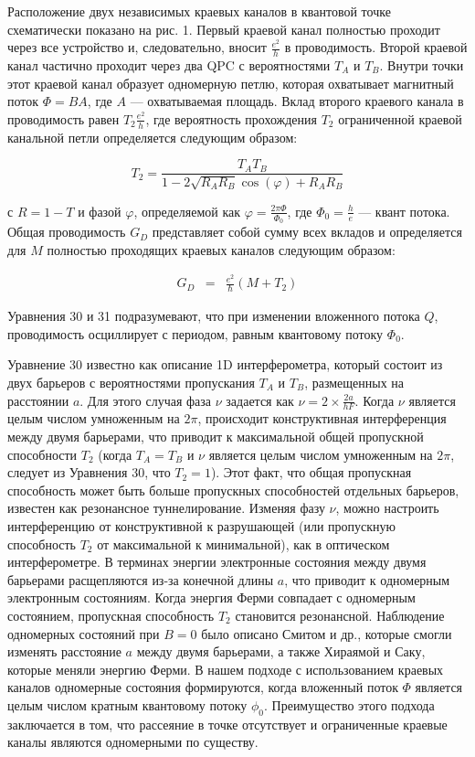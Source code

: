 \documentclass[a4paper,14pt]{extarticle}
\begin{document}
Расположение двух независимых краевых каналов в квантовой точке схематически показано на рис. 1. Первый краевой канал полностью проходит через все устройство и, следовательно, вносит $\frac{e^2}{h}$ в проводимость. Второй краевой канал частично проходит через два QPC с вероятностями $T_A$ и $T_B$. Внутри точки этот краевой канал образует одномерную петлю, которая охватывает магнитный поток $\Phi = BA$, где $A$ — охватываемая площадь. Вклад второго краевого канала в проводимость равен $T_2 \frac{e^2}{h}$, где вероятность прохождения $T_2$ ограниченной краевой канальной петли определяется следующим образом:

\begin{equation}
    T_2 = \frac{T_A T_B}{1 - 2 \sqrt{R_A R_B} \cos(\varphi) + R_A R_B}
    \end{equation}
    
с $R = 1 - T$ и фазой $\varphi$, определяемой как $\varphi = \frac{2\pi \Phi}{\Phi_0}$, где $\Phi_0 = \frac{h}{e}$ — квант потока. Общая проводимость $G_D$ представляет собой сумму всех вкладов и определяется для $M$ полностью проходящих краевых каналов следующим образом:

\begin{eqnarray}
    G_D &=& \frac{e^2}{\hbar} (M + T_2)
    \end{eqnarray}
    
Уравнения 30 и 31 подразумевают, что при изменении вложенного потока \(Q\), проводимость осциллирует с периодом, равным квантовому потоку \(\Phi_{\text{0}}\).

Уравнение 30 известно как описание 1D интерферометра, который состоит из двух барьеров с вероятностями пропускания \(T_A\) и \(T_B\), размещенных на расстоянии \(a\). Для этого случая фаза \(\nu\) задается как \(\nu=2 \times \frac{2a}{hF}\). Когда \(\nu\) является целым числом умноженным на \(2\pi\), происходит конструктивная интерференция между двумя барьерами, что приводит к максимальной общей пропускной способности \(T_2\) (когда \(T_A = T_B\) и \(\nu\) является целым числом умноженным на \(2\pi\), следует из Уравнения 30, что \(T_2 = 1\)). Этот факт, что общая пропускная способность может быть больше пропускных способностей отдельных барьеров, известен как резонансное туннелирование. Изменяя фазу \(\nu\), можно настроить интерференцию от конструктивной к разрушающей (или пропускную способность \(T_2\) от максимальной к минимальной), как в оптическом интерферометре. В терминах энергии электронные состояния между двумя барьерами расщепляются из-за конечной длины \(a\), что приводит к одномерным электронным состояниям. Когда энергия Ферми совпадает с одномерным состоянием, пропускная способность \(T_2\) становится резонансной. Наблюдение одномерных состояний при \(B=0\) было описано Смитом и др., которые смогли изменять расстояние \(a\) между двумя барьерами, а также Хираямой и Саку, которые меняли энергию Ферми. В нашем подходе с использованием краевых каналов одномерные состояния формируются, когда вложенный поток \(\Phi\) является целым числом кратным квантовому потоку \(\phi_0\). Преимущество этого подхода заключается в том, что рассеяние в точке отсутствует и ограниченные краевые каналы являются одномерными по существу.\cite{vander}
\end{document}
